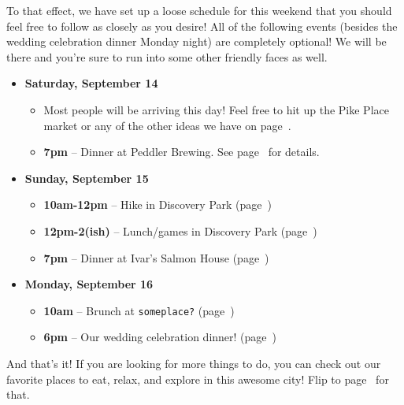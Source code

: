 \documentclass[10pt]{article}
\begin{document}
To that effect, we have set up a loose schedule for this weekend that you should 
feel free to follow as closely as you desire! All of the following events
(besides the wedding celebration dinner Monday night) are completely optional! We will be there
and you're sure to run into some other friendly faces as well.

\begin{itemize}[leftmargin=0.25em]
    \item \textbf{Saturday, September 14}
    \begin{itemize}[leftmargin=1em]
        \item Most people will be arriving this day! Feel free to hit up the Pike Place market or 
        any of the other ideas we have on page~\pageref{sec-things-to-do}.
        \item \textbf{7pm} -- Dinner at Peddler Brewing. See page~\pageref{subsec-dinner-sat} for details.
    \end{itemize}
    \item \textbf{Sunday, September 15}
    \begin{itemize}[leftmargin=1em]
        \item \textbf{10am-12pm} -- Hike in Discovery Park (page~\pageref{subsec-discovery})
        \item \textbf{12pm-2(ish)} -- Lunch/games in Discovery Park (page~\pageref{subsec-discovery})
        \item \textbf{7pm} -- Dinner at Ivar's Salmon House (page~\pageref{subsec-ivars})
    \end{itemize}
    \item \textbf{Monday, September 16}
    \begin{itemize}[leftmargin=1em]
        \item \textbf{10am} -- Brunch at \texttt{someplace?} (page~\pageref{subsec-monday-brunch})
        \item \textbf{6pm} -- Our wedding celebration dinner! (page~\pageref{subsec-wedding})
    \end{itemize}
\end{itemize}

And that's it! If you are looking for more things to do, you can check out our favorite 
places to eat, relax, and explore in this awesome city! Flip to page~\pageref{sec-things-to-do} for that.
\end{document}
